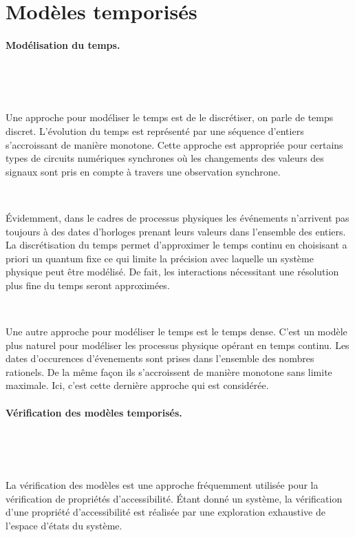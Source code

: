 \documentclass{article}
\begin{document}
  \section{Modèles temporisés}
  \label{sec:modeles-temp}

    \paragraph{Modélisation du temps.} ~
    
      ~

      Une approche pour modéliser le temps est de le discrétiser, on parle de
      temps discret. L'évolution du temps est représenté par une séquence
      d'entiers s'accroissant de manière monotone. Cette approche est appropriée
      pour certains types de circuits numériques synchrones où les changements
      des valeurs des signaux sont pris en compte à travers une observation
      synchrone.

      ~

      Évidemment, dans le cadres de processus physiques les événements
      n'arrivent pas toujours à des dates d'horloges prenant leurs valeurs dans
      l'ensemble des entiers. La discrétisation du temps permet d'approximer le
      temps continu en choisisant a priori un quantum fixe ce qui limite la
      précision avec laquelle un système physique peut être modélisé. De fait,
      les interactions nécessitant une résolution plus fine du temps seront
      approximées.

      ~

      Une autre approche pour modéliser le temps est le temps dense. C'est un
      modèle plus naturel pour modéliser les processus physique opérant en temps
      continu. Les dates d'occurences d'évenements sont prises dans l'ensemble
      des nombres rationels. De la même façon ils s'accroissent de manière
      monotone sans limite maximale. Ici, c'est cette dernière approche qui est
      considérée.

    \paragraph{Vérification des modèles temporisés.} ~

      ~

      La vérification des modèles est une approche fréquemment utilisée pour la
      vérification de propriétés d'accessibilité. Étant donné un système, la
      vérification d'une propriété d'accessibilité est réalisée par une
      exploration exhaustive de l'espace d'états du système.
\end{document}
